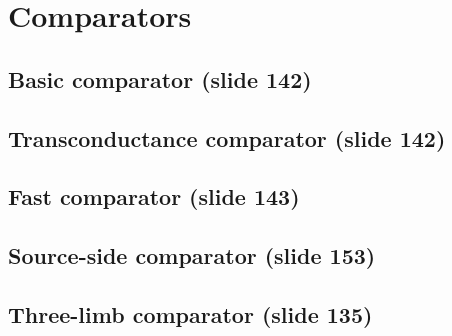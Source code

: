\chapter{Comparators}

\section{Basic comparator (slide 142)}

\section{Transconductance comparator (slide 142)}

\section{Fast comparator (slide 143)}

\section{Source-side comparator (slide 153)}

\section{Three-limb comparator (slide 135)}